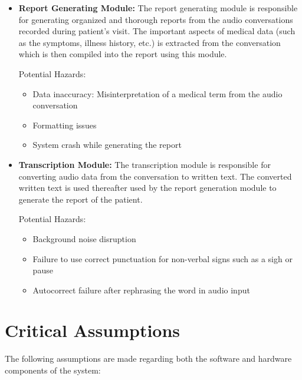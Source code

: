 \documentclass{article}
\begin{document}
\begin{itemize}
    \item \textbf{Report Generating Module:}
    The report generating module is responsible for generating organized and thorough reports from the audio conversations recorded during patient's visit. The important aspects of medical data (such as the symptoms, illness history, etc.) is extracted from the conversation which is then compiled into the report using this module.

    Potential Hazards:
    \begin{itemize}
        \item Data inaccuracy: Misinterpretation of a medical term from the audio conversation
        \item Formatting issues
        \item System crash while generating the report
    \end{itemize}

    \item \textbf{Transcription Module:}
    The transcription module is responsible for converting audio data from the conversation to written text. The converted written text is used thereafter used by the report generation module to generate the report of the patient.

    Potential Hazards:
    \begin{itemize}
        \item Background noise disruption
        \item Failure to use correct punctuation for non-verbal signs such as a sigh or pause
        \item Autocorrect failure after rephrasing the word in audio input
    \end{itemize}
    
\end{itemize}


\section{Critical Assumptions}


The following assumptions are made regarding both the software and hardware components of the system:
\end{document}
